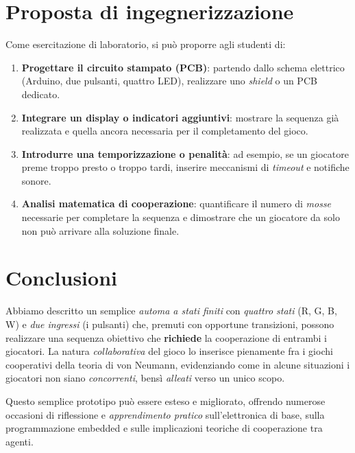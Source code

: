 \documentclass[a4paper,12pt]{report}
\newcommand{\Xd}[1]{\mathrm{X_{#1}}}  %
\begin{document}
\section{Proposta di ingegnerizzazione}
Come esercitazione di laboratorio, si può proporre agli studenti di:
\begin{enumerate}
  \item \textbf{Progettare il circuito stampato (PCB)}: partendo dallo schema elettrico (Arduino, due pulsanti, quattro LED), realizzare uno \emph{shield} o un PCB dedicato.  
  \item \textbf{Integrare un display o indicatori aggiuntivi}: mostrare la sequenza già realizzata e quella ancora necessaria per il completamento del gioco.  
  \item \textbf{Introdurre una temporizzazione o penalità}: ad esempio, se un giocatore preme troppo presto o troppo tardi, inserire meccanismi di \emph{timeout} e notifiche sonore.  
  \item \textbf{Analisi matematica di cooperazione}: quantificare il numero di \emph{mosse} necessarie per completare la sequenza e dimostrare che un giocatore da solo non può arrivare alla soluzione finale.
\end{enumerate}

\section{Conclusioni}
Abbiamo descritto un semplice \emph{automa a stati finiti} con \emph{quattro stati} (R, G, B, W) e \emph{due ingressi} (i pulsanti) che, premuti con opportune transizioni, possono realizzare una sequenza obiettivo che \textbf{richiede} la cooperazione di entrambi i giocatori. La natura \emph{collaborativa} del gioco lo inserisce pienamente fra i giochi cooperativi della teoria di von Neumann, evidenziando come in alcune situazioni i giocatori non siano \emph{concorrenti}, bensì \emph{alleati} verso un unico scopo.

Questo semplice prototipo può essere esteso e migliorato, offrendo numerose occasioni di riflessione e \emph{apprendimento pratico} sull’elettronica di base, sulla programmazione embedded e sulle implicazioni teoriche di cooperazione tra agenti.


\end{document}
